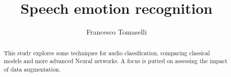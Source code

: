 \documentclass[runningheads]{llncs}
\begin{document}
\title{Speech emotion recognition}

\author{Francesco Tomaselli}
\maketitle

\begin{abstract}
    This study explores some techniques for audio classification, 
    comparing classical models and more advanced Neural networks. 
    A focus is putted on assessing the impact 
    of data augmentation.
\end{abstract}










\end{document}
